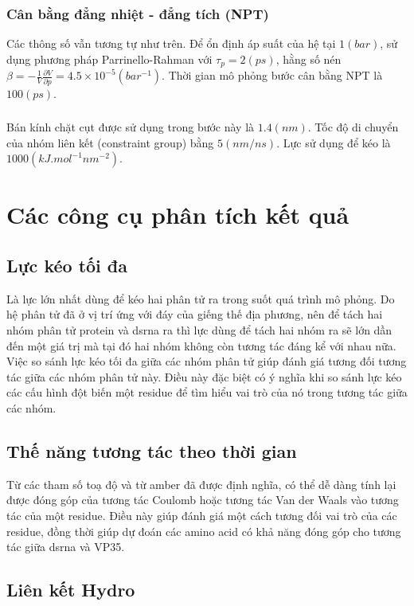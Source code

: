 \documentclass[12pt,a4paper,reqno, oneside]{book}
\begin{document}
\subsubsection{Cân bằng đẳng nhiệt - đẳng tích (NPT)}
Các thông số vẫn tương tự như trên. Để ổn định áp suất của hệ tại $1 \left(bar\right)$, sử dụng phương pháp Parrinello-Rahman với $\tau_{p}=2\left(ps\right)$, hằng số nén $\beta=-\frac{1}{V}\frac{\partial V}{\partial p} = 4.5\times 10^{-5}\left(bar^{-1}\right)$. Thời gian mô phỏng bước cân bằng NPT là $100\left(ps\right)$.
\subsubsection{}
Bán kính chặt cụt được sử dụng trong bước này là $1.4\left(nm\right)$. Tốc độ di chuyển của nhóm liên kết (constraint group) bằng $5\left(nm/ns\right)$. Lực sử dụng để kéo là $1000\left( kJ . mol^ {-1} nm^ {-2} \right)$.
\section{Các công cụ phân tích kết quả}
	\subsection{Lực kéo tối đa}
	
	Là lực lớn nhất dùng để kéo hai phân tử ra trong suốt quá trình mô phỏng. Do hệ phân tử đã ở vị trí ứng với đáy của giếng thế địa phương, nên để tách hai nhóm phân tử protein và \gls{dsrna} ra thì lực dùng để tách hai nhóm ra sẽ lớn dần đến một giá trị mà tại đó hai nhóm không còn tương tác đáng kể với nhau nữa.
	Việc so sánh lực kéo tối đa giữa các nhóm phân tử giúp đánh giá tương đối tương tác giữa các nhóm phân tử này. Điều này đặc biệt có ý nghĩa khi so sánh lực kéo các cấu hình đột biến một \gls{residue} để tìm hiểu vai trò của nó trong tương tác giữa các nhóm.
	\subsection{Thế năng tương tác theo thời gian}
	
	Từ các tham số toạ độ và từ \gls{amber} đã được định nghĩa, có thể dễ dàng tính lại được đóng góp của tương tác Coulomb hoặc tương tác Van der Waals vào tương tác của một \gls{residue}. Điều này giúp đánh giá một cách tương đối vai trò của các \gls{residue}, đồng thời giúp dự đoán các amino acid có khả năng đóng góp cho tương tác giữa \gls{dsrna} và VP35.
	\subsection{Liên kết Hydro}
	
\end{document}
